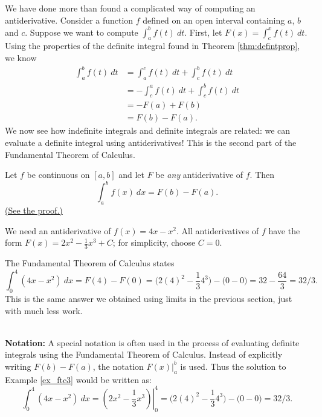 We have done more than found a complicated way of computing an antiderivative. Consider a function $f$ defined on an open interval containing $a$, $b$ and $c$. Suppose we want to compute $\int_a^b f(t)\ dt$. First, let $F(x) = \int_c^x f(t)\ dt$. Using the properties of the definite integral found in Theorem \ref{thm:defintprop}, we know 
		\begin{align*}\int_a^b f(t)\ dt &= \int_a^c f(t)\ dt + \int_c^b f(t)\ dt \\
											&= -\int_c^a f(t)\ dt + \int_c^b f(t)\ dt \\
											&=-F(a) + F(b)\\
											&= F(b) - F(a).
		\end{align*}
We now see how indefinite integrals and definite integrals are related: we can evaluate a definite integral using antiderivatives! This is the second part of the Fundamental Theorem of Calculus.

{Let $f$ be continuous on $[a,b]$ and let $F$ be \textit{any} antiderivative of $f$. Then $$\int_a^b f(x)\ dx = F(b) - F(a).$$
\hfill\hyperref[pf:FTC2]{(See the proof.)}
}


{We need an antiderivative of $f(x)=4x-x^2$. All antiderivatives of $f$ have the form $F(x) = 2x^2-\frac13x^3+C$; for simplicity, choose $C=0$.

The Fundamental Theorem of Calculus states 
		$$\int_0^4(4x-x^2)\ dx = F(4)-F(0) = \big(2(4)^2-\frac134^3\big)-\big(0-0\big) = 32-\frac{64}3 = 32/3.$$
This is the same answer we obtained using limits in the previous section, just with much less work.
}\\

\noindent\textbf{Notation:} A special notation is often used in the process of evaluating definite integrals using the Fundamental Theorem of Calculus. Instead of explicitly writing $F(b)-F(a)$, the notation $F(x)\Big|_a^b$ is used. Thus the solution to Example \ref{ex_ftc3} would be written as:
	$$\int_0^4(4x-x^2)\ dx = \left.\left(2x^2-\frac13x^3\right)\right|_0^4 = \big(2(4)^2-\frac134^3\big)-\big(0-0\big) =  32/3.$$

